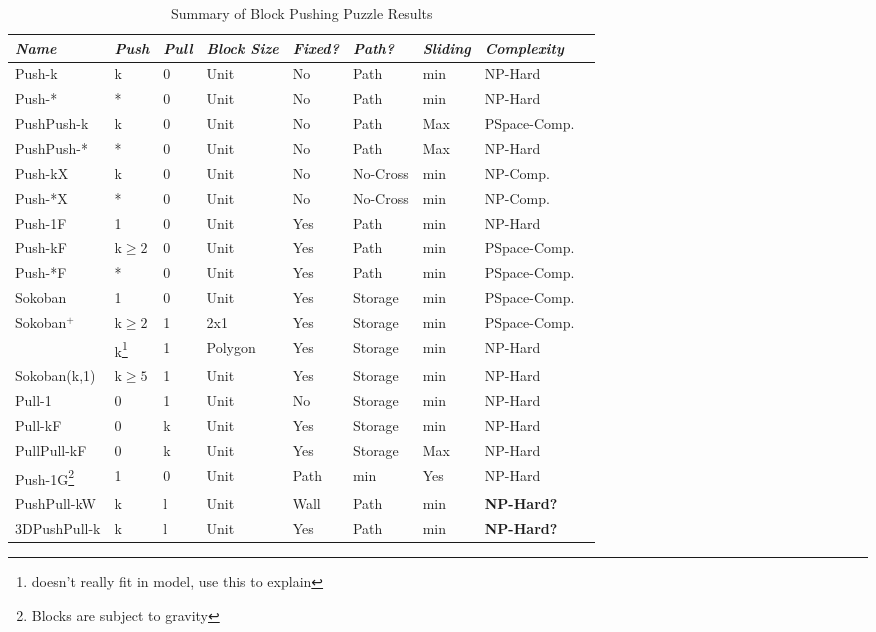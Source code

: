 \documentclass[11pt]{article}
\begin{document}
\begin{table}[ht]
\centering
\begin{tabular}{|l|l|l|l|l|l|l|l|l|}
\hline
\emph{Name} & \emph{Push} & \emph{Pull} & \emph{Block Size} & \emph{Fixed?} & \emph{Path?} & \emph{Sliding} & \emph{Complexity} \\ \hline
\hline
Push-k & k & 0 & Unit & No & Path & min & NP-Hard\cite{Push100} \\ \hline
Push-* & * & 0 & Unit & No & Path  & min & NP-Hard\cite{Push*00} \\ \hline
PushPush-k & k & 0 & Unit & No & Path  & Max & PSpace-Comp.\cite{PushPushk04} \\ \hline
PushPush-* & * & 0 & Unit & No & Path  & Max & NP-Hard\cite{Push*00} \\ \hline
Push-kX & k & 0 & Unit & No & No-Cross  & min & NP-Comp.\cite{non-crossing01} \\ \hline
Push-*X & * & 0 & Unit & No & No-Cross  & min & NP-Comp.\cite{non-crossing01} \\ \hline
Push-1F & 1 & 0 & Unit & Yes & Path  & min &  NP-Hard \cite{DO92} \\ \hline
Push-kF & k$\geq 2$ & 0 & Unit & Yes & Path  & min & PSpace-Comp.\cite{Push2F02} \\ \hline
Push-*F & * & 0 & Unit & Yes & Path  & min & PSpace-Comp.\cite{Push2F02} \\ \hline
Sokoban & 1 & 0 & Unit & Yes & Storage  & min & PSpace-Comp.\cite{Sokoban98} \\ \hline
Sokoban$^+$ & k$\geq 2$ & 1 & 2x1 & Yes & Storage  & min & PSpace-Comp.\cite{DZ96} \\ \hline
 & k\footnote{doesn't really fit in model, use this to explain} & 1  & Polygon & Yes & Storage  & min & NP-Hard\cite{PushPull91}\\ \hline
Sokoban(k,1) & k$\geq 5$ & 1 & Unit & Yes & Storage  & min & NP-Hard\cite{DZ96} \\ \hline
Pull-1 & 0 & 1 & Unit & No & Storage  & min & NP-Hard\cite{Pull10} \\ \hline
Pull-kF & 0 & k & Unit & Yes & Storage  & min &  NP-Hard\cite{Pull10} \\ \hline
PullPull-kF & 0 & k & Unit & Yes & Storage  & Max  & NP-Hard\cite{Pull10} \\ \hline
Push-1G\footnote{Blocks are subject to gravity} & 1 & 0 & Unit &  Path  & min & Yes & NP-Hard\cite{Gravity} \\ \hline
PushPull-kW & k & l & Unit & Wall & Path  & min & \textbf{NP-Hard?} \\ \hline
3DPushPull-k & k & l & Unit & Yes & Path & min &  \textbf{NP-Hard?} \\ \hline

\end{tabular}
\caption{Summary of Block Pushing Puzzle Results}
\label{BlocksTable}
\end{table}
\end{document}
